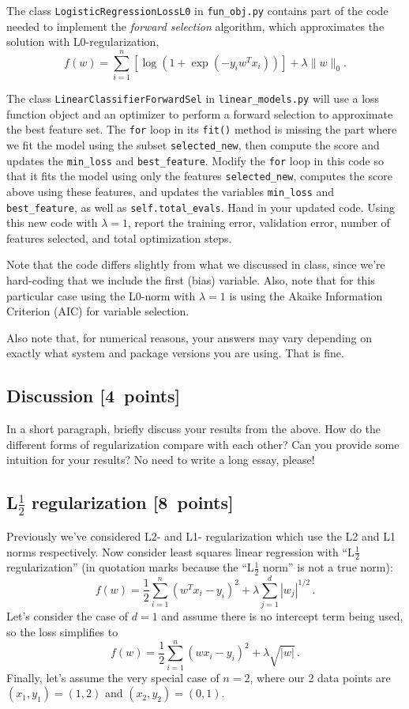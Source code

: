 \documentclass{article}
\newcommand{\blu}[1]{{\textcolor{blu}{#1}}}
\let\ask\blu
\newcommand\pts[1]{\textcolor{pointscolour}{[#1~points]}}
\newcommand{\norm}[1]{\lVert #1 \rVert}
\begin{document}
The class \verb|LogisticRegressionLossL0| in \verb|fun_obj.py| contains part of the code needed to implement the \emph{forward selection} algorithm,
which approximates the solution with L0-regularization,
\[
f(w) =  \sum_{i=1}^n \left[\log(1+\exp(-y_iw^Tx_i))\right] + \lambda\norm{w}_0.
\]

The class \verb|LinearClassifierForwardSel| in \verb|linear_models.py| will use a loss function object and an optimizer to perform a forward selection to approximate the best feature set.
The \verb|for| loop in its \verb|fit()| method is missing the part where we fit the model using the subset \verb|selected_new|,
then compute the score and updates the \verb|min_loss| and \verb|best_feature|.
Modify the \verb|for| loop in this code so that it fits the model using only
the features \verb|selected_new|, computes the score above using these features,
and updates the variables \verb|min_loss| and \verb|best_feature|,
as well as \verb|self.total_evals|.
\ask{Hand in your updated code. Using this new code with $\lambda=1$,
report the training error, validation error, number of features selected, and total optimization steps.}

Note that the code differs slightly from what we discussed in class,
since we're hard-coding that we include the first (bias) variable.
Also, note that for this particular case using the L0-norm with $\lambda=1$
is using the Akaike Information Criterion (AIC) for variable selection.

Also note that, for numerical reasons, your answers may vary depending on exactly what system and package versions you are using. That is fine.

\subsection{Discussion \pts{4}}

In a short paragraph, briefly discuss your results from the above. How do the
different forms of regularization compare with each other?
Can you provide some intuition for your results? No need to write a long essay, please!


\subsection{L$\frac12$ regularization \pts{8}}

Previously we've considered L2- and L1- regularization which use the L2 and L1 norms respectively. Now consider
least squares linear regression with ``L$\frac12$ regularization'' (in quotation marks because the ``L$\frac12$ norm'' is not a true norm):
\[
f(w) = \frac{1}{2} \sum_{i=1}^n (w^Tx_i - y_i)^2 + \lambda \sum_{j=1}^d |w_j|^{1/2} \, .
\]
Let's consider the case of $d=1$ and
assume there is no intercept term being used, so the loss simplifies to
\[
f(w) = \frac{1}{2} \sum_{i=1}^n (wx_i - y_i)^2 + \lambda \sqrt{|w|} \, .
\]
Finally, let's assume the very special case of $n=2$,
where our 2 data points are $(x_1,y_1)=(1,2)$ and $(x_2,y_2)=(0,1)$.
\end{document}
